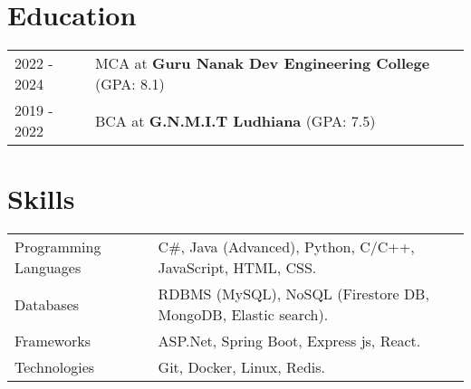 \documentclass[a4paper,12pt]{article}
\begin{document}
\section{Education}
\begin{tabularx}{\linewidth}{@{}l X@{}}	
2022 - 2024 & MCA at \textbf{Guru Nanak Dev Engineering College} \hfill \normalsize (GPA: 8.1) \\

2019 - 2022 & BCA at \textbf{G.N.M.I.T Ludhiana} \hfill (GPA: 7.5) \\ 
\end{tabularx}

\section{Skills}
\begin{tabularx}{\linewidth}{@{}l X@{}}
Programming Languages &  \normalsize{C\#, Java (Advanced), Python, C/C++, JavaScript, HTML, CSS.}\\
Databases  &  \normalsize{RDBMS (MySQL), NoSQL (Firestore DB, MongoDB, Elastic
search).}\\ 
Frameworks  &  \normalsize{ASP.Net, Spring Boot, Express js, React.}\\
Technologies  &  \normalsize{Git, Docker, Linux, Redis.}\\  
\end{tabularx}

\vfill
{}
\end{document}

